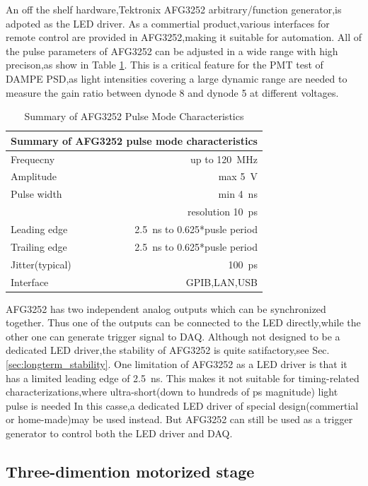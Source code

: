 \documentclass[preprint,5p,times]{elsarticle}
\begin{document}
An off the shelf hardware,Tektronix AFG3252 arbitrary/function generator,is adpoted as the LED driver.
As a commertial product,various interfaces for remote control are provided in AFG3252,making it suitable for automation.
All of the pulse parameters of AFG3252 can be adjusted in a wide range with high precison,as show in Table \ref{tab:afg3252}.
This is a critical feature for the PMT test of DAMPE PSD,as light intensities covering a large dynamic range are needed to measure the gain ratio between dynode 8 and dynode 5 at different voltages.
\begin{table}[h!]
\caption{Summary of AFG3252 Pulse Mode Characteristics}
\label{tab:afg3252}
 \begin{center}
 \begin{tabular}{lr}
 \multicolumn{2}{l}{Summary of AFG3252 pulse mode characteristics}\\ \hline
 Frequecny & up to \SI{120}{\MHz} \\
 Amplitude & max \SI{5}{\volt} \\
 Pulse width & min \SI{4}{\nano\second} \\
             & resolution \SI{10}{\pico\second} \\
 Leading edge & \SI{2.5}{\nano\second} to 0.625*pusle period \\
 Trailing edge & \SI{2.5}{\nano\second} to 0.625*pusle period \\
 Jitter(typical) & \SI{100}{\pico\second} \\
 Interface     & GPIB,LAN,USB
 \end{tabular}
 \end{center}
\end{table} 
AFG3252 has two independent analog outputs which can be synchronized together.
Thus one of the outputs can be connected to the LED directly,while the other one can generate trigger signal to DAQ. 
Although not designed to be a dedicated LED driver,the stability of AFG3252 is quite satifactory,see Sec.\ref{sec:longterm_stability}.
One limitation of AFG3252 as a LED driver is that it has a limited leading edge of \SI{2.5}{ns}.
This makes it not suitable for timing-related characterizations,where ultra-short(down to hundreds of \si{\pico\second} magnitude) light pulse is needed
In this casse,a dedicated LED driver of special design(commertial or home-made)may be used instead.
But AFG3252 can still be used as a trigger generator to control both the LED driver and DAQ.

\subsection{Three-dimention motorized stage}
\label{sec:platform}
\end{document}
